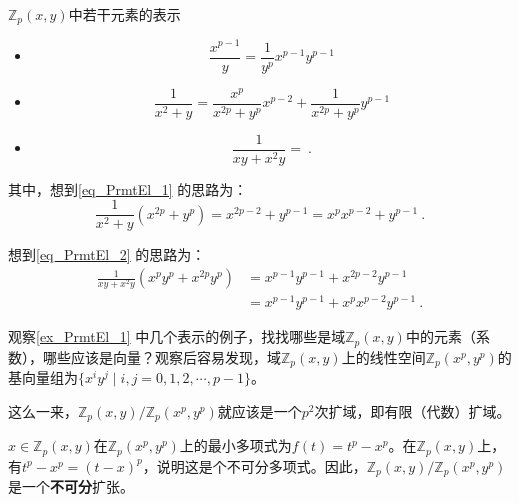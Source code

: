 \begin{example}{$\mathbb{Z}_p(x, y)$中若干元素的表示}\label{ex_PrmtEl_1}


\begin{itemize}

\item 
\begin{equation}
\frac{x^{p-1}}{y} = \frac{1}{y^p}x^{p-1}y^{p-1}
\end{equation}

\item 
\begin{equation}\label{eq_PrmtEl_1}
\frac{1}{x^2+y} = \frac{x^p}{x^{2p}+y^p}x^{p-2} + \frac{1}{x^{2p}+y^p}y^{p-1}
\end{equation}

\item 
\begin{equation}\label{eq_PrmtEl_2}
\frac{1}{xy+x^2y} = ~.
\end{equation}

\end{itemize}



其中，想到\autoref{eq_PrmtEl_1} 的思路为：
\begin{equation}
\frac{1}{x^2+y}(x^{2p}+y^p) = x^{2p-2}+y^{p-1} = x^px^{p-2}+y^{p-1}~.
\end{equation}

想到\autoref{eq_PrmtEl_2} 的思路为：
\begin{equation}
\begin{aligned}
\frac{1}{xy+x^2y}(x^py^p+x^{2p}y^p) &= x^{p-1}y^{p-1}+x^{2p-2}y^{p-1} \\
&= x^{p-1}y^{p-1}+x^px^{p-2}y^{p-1}~.
\end{aligned}
\end{equation}

\end{example}

观察\autoref{ex_PrmtEl_1} 中几个表示的例子，找找哪些是域$\mathbb{Z}_p(x, y)$中的元素（系数），哪些应该是向量？观察后容易发现，域$\mathbb{Z}_p(x, y)$上的线性空间$\mathbb{Z}_p(x^p, y^p)$的基向量组为$\{x^iy^j\mid i, j=0, 1, 2, \cdots, p-1\}$。

这么一来，$\mathbb{Z}_p(x, y)/\mathbb{Z}_p(x^p, y^p)$就应该是一个$p^2$次扩域，即有限（代数）扩域。

$x\in\mathbb{Z}_p(x, y)$在$\mathbb{Z}_p(x^p, y^p)$上的最小多项式为$f(t)=t^p-x^p$。在$\mathbb{Z}_p(x, y)$上，有$t^p-x^p=(t-x)^p$，说明这是个不可分多项式。因此，$\mathbb{Z}_p(x, y)/\mathbb{Z}_p(x^p, y^p)$是一个\textbf{不可分}扩张。

